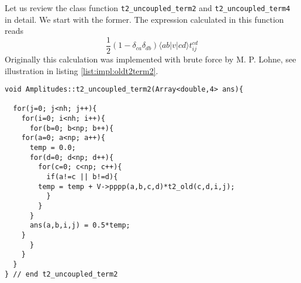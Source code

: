Let us review the class function \texttt{t2\_uncoupled\_term2} and \texttt{t2\_uncoupled\_term4} in detail. We start with the former. The expression calculated in this function reads
\begin{equation*}
\frac{1}{2}(1-\delta_{ca}\delta_{db})\langle ab|v|cd\rangle t_{ij}^{cd}
\label{eq:impl:t2term2expression}
\end{equation*}
Originally this calculation was implemented with brute force by M. P. Lohne, see illustration in listing \ref{list:impl:oldt2term2}. 
\begin{lstlisting}[label={list:impl:oldt2term2},caption={M.P.Lohne's brute force implementation of amp1 class function t2\_uncoupled\_term2}]
void Amplitudes::t2_uncoupled_term2(Array<double,4> ans){

  for(j=0; j<nh; j++){
    for(i=0; i<nh; i++){
      for(b=0; b<np; b++){
	for(a=0; a<np; a++){
	  temp = 0.0;
	  for(d=0; d<np; d++){
	    for(c=0; c<np; c++){
	      if(a!=c || b!=d){
		temp = temp + V->pppp(a,b,c,d)*t2_old(c,d,i,j);
	      }
	    }
	  }
	  ans(a,b,i,j) = 0.5*temp;
	}
      }
    }
  }
} // end t2_uncoupled_term2  
\end{lstlisting}


